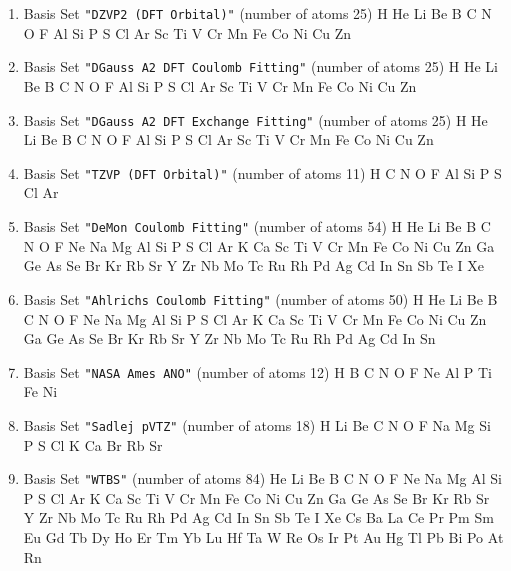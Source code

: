 \begin{enumerate}
\item Basis Set \verb#"DZVP2 (DFT Orbital)"# (number of atoms 25)  \newline 
  H He Li Be B C N O F Al Si P S Cl Ar Sc Ti V Cr Mn Fe Co Ni Cu Zn



\item Basis Set \verb#"DGauss A2 DFT Coulomb Fitting"# (number of atoms 25)  \newline 
  H He Li Be B C N O F Al Si P S Cl Ar Sc Ti V Cr Mn Fe Co Ni Cu Zn



\item Basis Set \verb#"DGauss A2 DFT Exchange Fitting"# (number of atoms 25)  \newline 
  H He Li Be B C N O F Al Si P S Cl Ar Sc Ti V Cr Mn Fe Co Ni Cu Zn



\item Basis Set \verb#"TZVP (DFT Orbital)"# (number of atoms 11)  \newline 
  H C N O F Al Si P S Cl Ar


\item Basis Set \verb#"DeMon Coulomb Fitting"# (number of atoms 54)  \newline 
  H He Li Be B C N O F Ne Na Mg Al Si P S Cl Ar K Ca Sc Ti V Cr Mn
 Fe Co Ni Cu Zn Ga Ge As Se Br Kr Rb Sr Y Zr Nb Mo Tc Ru Rh Pd Ag Cd In Sn
 Sb Te I Xe


\item Basis Set \verb#"Ahlrichs Coulomb Fitting"# (number of atoms 50)  \newline 
  H He Li Be B C N O F Ne Na Mg Al Si P S Cl Ar K Ca Sc Ti V Cr Mn
 Fe Co Ni Cu Zn Ga Ge As Se Br Kr Rb Sr Y Zr Nb Mo Tc Ru Rh Pd Ag Cd In Sn



\item Basis Set \verb#"NASA Ames ANO"# (number of atoms 12)  \newline 
  H B C N O F Ne Al P Ti Fe Ni


\item Basis Set \verb#"Sadlej pVTZ"# (number of atoms 18)  \newline 
  H Li Be C N O F Na Mg Si P S Cl K Ca Br Rb Sr


\item Basis Set \verb#"WTBS"# (number of atoms 84)  \newline 
  He Li Be B C N O F Ne Na Mg Al Si P S Cl Ar K Ca Sc Ti V Cr Mn Fe
 Co Ni Cu Zn Ga Ge As Se Br Kr Rb Sr Y Zr Nb Mo Tc Ru Rh Pd Ag Cd In Sn Sb
 Te I Xe Cs Ba La Ce Pr Pm Sm Eu Gd Tb Dy Ho Er Tm Yb Lu Hf Ta W Re Os Ir
 Pt Au Hg Tl Pb Bi Po At Rn



\end{enumerate}
